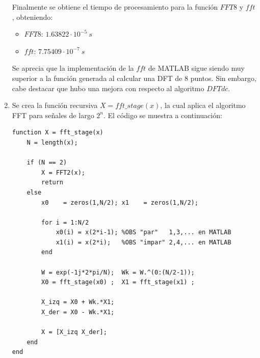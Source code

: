 \begin{enumerate}
Finalmente se obtiene el tiempo de procesamiento para la función $FFT8$ y $fft$, obteniendo:
\begin{itemize}
    \item $FFT8$: $1.63822\cdot 10^{-5}~s$ %
    \item $fft$:  $7.75409\cdot 10^{-7}~s$ %
\end{itemize}
Se aprecia que la implementación de la $fft$ de MATLAB sigue siendo muy superior a la función generada al calcular una DFT de 8 puntos. Sin embargo, cabe destacar que hubo una mejora con respecto al algoritmo $DFTdc$.

\item Se crea la función recursiva $X = fft\_stage(x)$, la cual aplica el algoritmo FFT para señales de largo $2^{n}$. El código se muestra a continuación:

\begin{lstlisting}
function X = fft_stage(x)
    N = length(x);
    
    if (N == 2)
        X = FFT2(x);
        return
    else    
        x0    = zeros(1,N/2); x1    = zeros(1,N/2);        
    
        for i = 1:N/2
            x0(i) = x(2*i-1); %OBS "par"   1,3,... en MATLAB
            x1(i) = x(2*i);   %OBS "impar" 2,4,... en MATLAB       
        end
    
        W = exp(-1j*2*pi/N);  Wk = W.^(0:(N/2-1));        
        X0 = fft_stage(x0) ;  X1 = fft_stage(x1) ; 
    
        X_izq = X0 + Wk.*X1;
        X_der = X0 - Wk.*X1;
    
        X = [X_izq X_der];
    end
end
\end{lstlisting}


\end{enumerate}
